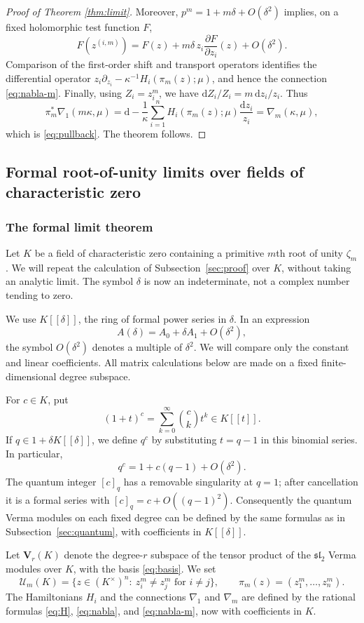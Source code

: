 \documentclass[12pt]{amsart}
\let\frak\mathfrak
\theoremstyle{definition}
\numberwithin{equation}{section}
\theoremstyle{definition}
\let\mc\mathcal
\let\ka\kappa
\def\slt{{\frak{sl}_2}}
\begin{document}
\begin{proof}[Proof of Theorem \ref{thm:limit}]
Moreover, $p^m=1+m\delta+O(\delta^2)$ implies, on a
fixed holomorphic test function $F$,
\[
 F(z^{(i,m)})
 =F(z)+m\delta\,z_i\frac{\partial F}{\partial z_i}(z)
 +O(\delta^2).
\]
Comparison of the first-order shift and transport operators
identifies the differential operator
$z_i\partial_{z_i}-\ka^{-1}H_i(\pi_m(z);\mu)$,
and hence the connection \eqref{eq:nabla-m}.
Finally, using $Z_i=z_i^m$, we have
$\mathrm{d}Z_i/Z_i=m\,\mathrm{d}z_i/z_i$.  Thus
\[
 \pi_m^*\nabla_1(m\ka,\mu)
 =\mathrm{d}-\frac1\ka\sum_{i=1}^n
 H_i(\pi_m(z);\mu)\frac{\mathrm{d}z_i}{z_i}
 =\nabla_m(\ka,\mu),
\]
which is \eqref{eq:pullback}.  The theorem follows.
\end{proof}

\subsection{Formal root-of-unity limits over fields of characteristic zero}
\label{app:formal-limit}

\subsubsection{The formal limit theorem}

Let $K$ be a field of characteristic zero containing a primitive
$m$th root of unity $\zeta_m$.  We will repeat the calculation
of Subsection~\ref{sec:proof} over $K$, without taking an analytic
limit.  The symbol $\delta$ is now an indeterminate, not a complex
number tending to zero.

We use $K[[\delta]]$, the ring of formal power series in $\delta$.
In an expression
\[
 A(\delta)=A_0+\delta A_1+O(\delta^2),
\]
the symbol $O(\delta^2)$ denotes a multiple of $\delta^2$.
We will compare only the constant and linear coefficients.
All matrix calculations below are made on a fixed
finite-dimensional degree subspace.

For $c\in K$, put
\[
 (1+t)^c=\sum_{k=0}^{\infty}\binom{c}{k}t^k\in K[[t]].
\]
If $q\in1+\delta K[[\delta]]$, we define $q^c$ by substituting
$t=q-1$ in this binomial series.  In particular,
\[
 q^c=1+c(q-1)+O(\delta^2).
\]
The quantum integer $[c]_q$
has a removable singularity at $q=1$; after cancellation it is a
formal series with $[c]_q=c+O((q-1)^2)$.
Consequently the quantum Verma modules on each fixed degree can
be defined by the same formulas as in Subsection~\ref{sec:quantum},
with coefficients in $K[[\delta]]$.

Let $\mathbf V_r(K)$ denote the degree-$r$ subspace of the tensor
product of the $\slt$ Verma modules over $K$, with the basis
\eqref{eq:basis}.  We set
\[
 \mc U_m(K)=\{z\in(K^\times)^n:\ z_i^m\ne z_j^m
             \text{ for }i\ne j\},
 \qquad \pi_m(z)=(z_1^m,\ldots,z_n^m).
\]
The Hamiltonians $H_i$ and the connections $\nabla_1$ and
$\nabla_m$ are defined by the rational formulas
\eqref{eq:H}, \eqref{eq:nabla}, and \eqref{eq:nabla-m},
now with coefficients in $K$.
\end{document}
